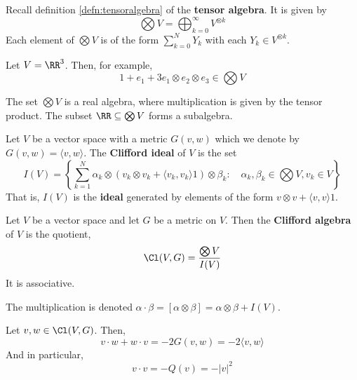 Recall definition \ref{defn:tensoralgebra} of the \textbf{tensor algebra}. It is given by 
\[\bigotimes V = \bigoplus_{k=0}^\infty V^{\otimes k}\]
Each element of $\bigotimes V$ is of the form $\sum_{k=0}^N Y_k$ with each $Y_k \in V^{\otimes k}$. 
\begin{example}
    Let $V = \RR^3$. Then, for example,
    \[1 + e_1 + 3e_1\otimes e_2 \otimes e_3 \in \bigotimes V\]
\end{example}
\begin{remark*}
    The set $\bigotimes V$ is a real algebra, where multiplication is given by the tensor product. The subset $\RR \subseteq \bigotimes V$ forms a subalgebra.
\end{remark*}

\begin{defn}
Let $V$ be a vector space with a metric $G(v,w)$ which we denote by $G(v,w) = \langle v,w\rangle$. The \textbf{Clifford ideal} of $V$ is the set
    \[I(V)=\left\{\sum_{k=1}^N \alpha_k \otimes(v_k\otimes v_k+\langle v_k,v_k\rangle 1)\otimes \beta_k: \quad \alpha_k,\beta_k \in \bigotimes V, v_k\in V\right\}\]
    That is, $I(V)$ is the \textbf{ideal} generated by elements of the form $v\otimes v+\langle v,v\rangle1$. 
\end{defn}
\begin{defn}
Let $V$ be a vector space and let $G$ be a metric on $V$. Then the \textbf{Clifford algebra} of $V$ is the quotient,
    \begin{equation}
        \Cl(V,G) = \frac{\bigotimes V}{I(V)}
    \end{equation}
It is associative.
\end{defn}
\begin{remark*}
    The multiplication is denoted $\alpha \cdot \beta = [\alpha\otimes\beta] = \alpha\otimes\beta + I(V)$.
\end{remark*}
\begin{thm}
Let $v,w \in \Cl(V,G)$. Then,
    \begin{equation}
        v\cdot w + w\cdot v = - 2G(v,w) = -2\langle v,w\rangle
    \end{equation}
    And in particular, 
    \begin{equation}
        v\cdot v = -Q(v)=-|v|^2
    \end{equation}
\end{thm}
